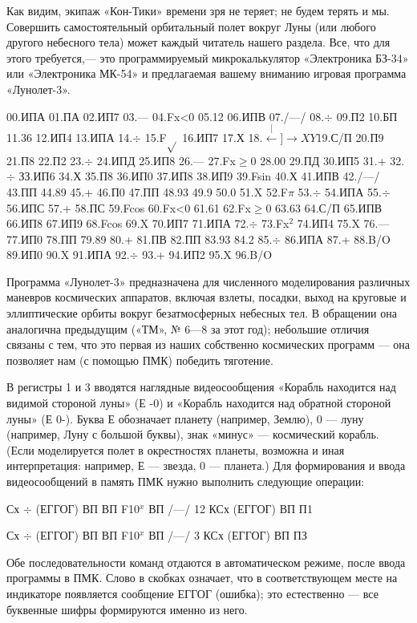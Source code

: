 \documentclass[11pt,a4paper,oneside]{article}
\def\XY{$\stackrel[\leftarrow]{\rightarrow}{XY}$}
\begin{document}
Как видим, экипаж «Кон-Тики» времени зря не теряет; не будем терять и мы. Совершить самостоятельный орбитальный полет вокруг Луны (или любого другого небесного тела) может каждый читатель нашего раздела. Все, что для этого требуется,— это программируемый микрокалькулятор «Электроника БЗ-34» или «Электроника МК-54» и предлагаемая вашему вниманию игровая программа «Лунолет-3».

00.ИПА 01.ПА 02.ИП7 03.— 04.Fx<0 05.12 06.ИПВ 07./—/ 08.$\div$ 09.П2 10.БП 11.36 12.ИП4 13.ИПА 14.$\div$ 15.F$\sqrt{}$
16.ИП7 17.Х 18.\XY 19.С/П 20.П9 21.П8 22.П2 23.$\div$ 24.ИПД 25.ИП8 26.— 27.Fx$\geq$0 28.00 29.ПД 30.ИП5 31.+
32.$\div$ ЗЗ.ИП6 34.Х 35.П8 36.ИП0
37.ИП8 38.ИП9 39.Fsin 40.Х 41.ИПВ
42./—/ 43.ПП 44.89 45.+ 46.П0 47.ПП 48.93 49.9 50.0 51.X 52.F$\pi$ 53.$\div$ 54.ИПА
55.$\div$ 56.ИПС 57.+ 58.ПС 59.Fcos 60.Fx<0 61.61 62.Fx$\geq$0 63.63 64.С/П 65.ИПВ 66.ИП8 67.ИП9 68.Fcos 69.X 70.ИП7 71.ИПА 72.$\div$ 73.Fx$^{2}$ 74.ИП4 75.X 76.— 77.ИП0 78.ПП 79.89 80.+ 81.ПВ 82.ПП 83.93 84.2 85.$\div$ 86.ИПА 87.+ 88.B/O 89.ИП0 90.X 91.ИПА 92.$\div$ 93.+ 94.ИП2 95.X 96.B/O

Программа «Лунолет-3» предназначена для численного моделирования различных маневров космических аппаратов, включая взлеты, посадки, выход на круговые и эллиптические орбиты вокруг безатмосферных небесных тел. В обращении она аналогична предыдущим («ТМ», № 6—8 за этот год); небольшие отличия связаны с тем, что это первая из наших собственно космических программ — она позволяет нам (с помощью ПМК) победить тяготение.

В регистры 1 и 3 вводятся наглядные видеосообщения «Корабль находится над видимой стороной луны» (Е -0) и «Корабль находится над обратной стороной луны» (Е 0-). Буква Е обозначает планету (например, Землю), 0 — луну (например, Луну с большой буквы), знак «минус» — космический корабль. (Если моделируется полет в окрестностях планеты, возможна и иная интерпретация: например, Е — звезда, 0 — планета.) Для формирования и ввода видеосообщений в память ПМК нужно выполнить следующие операции:

Сх $\div$ (ЕГГОГ) ВП ВП F10$^{x}$ ВП /—/ 12 КСх (ЕГГОГ) ВП П1

Сх $\div$ (ЕГГОГ) ВП ВП F10$^{x}$ ВП /—/ 3 КСх (ЕГГОГ) ВП ПЗ

Обе последовательности команд отдаются в автоматическом режиме, после ввода программы в ПМК. Слово в скобках означает, что в соответствующем месте на индикаторе появляется сообщение ЕГГОГ (ошибка); это естественно — все буквенные шифры формируются именно из него.
\end{document}

